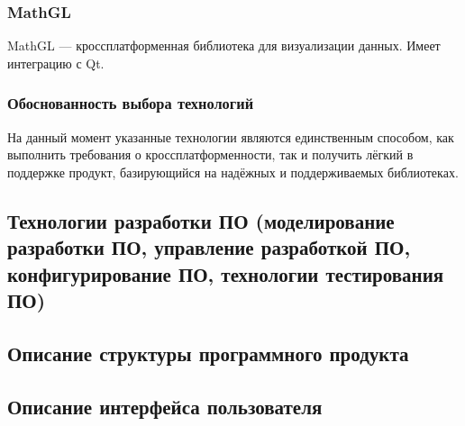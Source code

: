 \subsubsection{MathGL}
MathGL — кроссплатформенная библиотека для визуализации данных. Имеет интеграцию с Qt.

\subsubsection{Обоснованность выбора технологий}
На данный момент указанные технологии являются единственным способом, как выполнить требования о кроссплатформенности, так и получить лёгкий в поддержке
продукт, базирующийся на надёжных и поддерживаемых библиотеках.

\subsection{Технологии разработки ПО (моделирование разработки ПО, управление разработкой ПО, конфигурирование ПО, технологии тестирования ПО)}
\subsection{Описание структуры программного продукта}
\subsection{Описание интерфейса пользователя}

